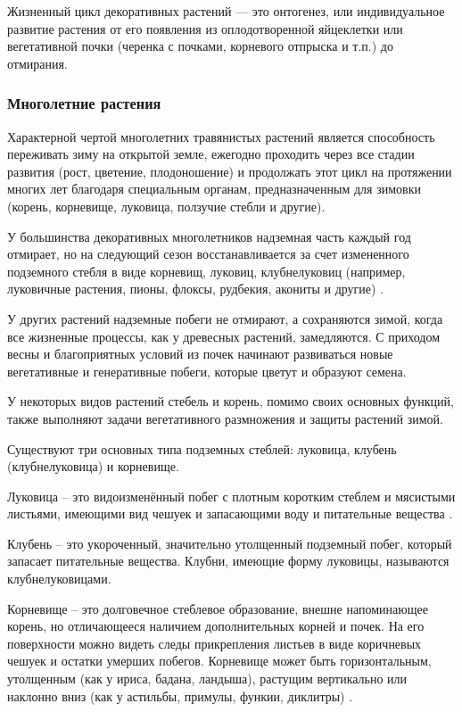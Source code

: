 Жизненный цикл декоративных растений — это онтогенез, или индивидуальное развитие растения от его появления из оплодотворенной яйцеклетки или вегетативной почки (черенка с почками, корневого отпрыска и т.п.) до отмирания.

\subsubsection{Многолетние растения}

Характерной чертой многолетних травянистых растений является способность переживать зиму на открытой земле, ежегодно проходить через все стадии развития (рост, цветение, плодоношение) и продолжать этот цикл на протяжении многих лет благодаря специальным органам, предназначенным для зимовки (корень, корневище, луковица, ползучие стебли и другие).

У большинства декоративных многолетников надземная часть каждый год отмирает, но на следующий сезон восстанавливается за счет измененного подземного стебля в виде корневищ, луковиц, клубнелуковиц (например, луковичные растения, пионы, флоксы, рудбекия, акониты и другие) \cite{viyginaOpen}.

У других растений надземные побеги не отмирают, а сохраняются зимой, когда все жизненные процессы, как у древесных растений, замедляются. С приходом весны и благоприятных условий из почек начинают развиваться новые вегетативные и генеративные побеги, которые цветут и образуют семена.

У некоторых видов растений стебель и корень, помимо своих основных функций, также выполняют задачи вегетативного размножения и защиты растений зимой.

Существуют три основных типа подземных стеблей: луковица, клубень (клубнелуковица) и корневище.

Луковица – это видоизменённый побег с плотным коротким стеблем и мясистыми листьями, имеющими вид чешуек и запасающими воду и питательные вещества \cite{belyaevskaya}.

Клубень -- это укороченный, значительно утолщенный подземный побег, который запасает питательные вещества. Клубни, имеющие форму луковицы, называются клубнелуковицами.

Корневище -- это долговечное стеблевое образование, внешне напоминающее корень, но отличающееся наличием дополнительных корней и почек. На его поверхности можно видеть следы прикрепления листьев в виде коричневых чешуек и остатки умерших побегов. Корневище может быть горизонтальным, утолщенным (как у ириса, бадана, ландыша), растущим вертикально или наклонно вниз (как у астильбы, примулы, функии, диклитры) \cite{aldohina}.

